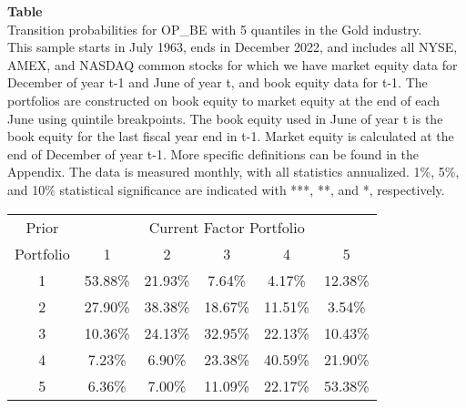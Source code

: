 \begin{table*}[ht!]
\raggedright
{}
\label{tab: transition_probs_OP_BE_Gold_with_5_quantiles}
\textbf{Table \thetable} \\
Transition probabilities for OP_BE with 5 quantiles in the Gold industry. \\
\hspace*{1em}This sample starts in July 1963, ends in December 2022, and includes all NYSE, AMEX, and NASDAQ common stocks for which we have market equity data for December of year t-1 and June of year t, and book equity data for t-1. The portfolios are constructed on book equity to market equity at the end of each June using quintile breakpoints.  The book equity used in June of year t is the book equity for the last fiscal year end in t-1.  Market equity is calculated at the end of December of year t-1.  More specific definitions can be found in the Appendix.  The data is measured monthly, with all statistics annualized.  1\%, 5\%, and 10\% statistical significance are indicated with ***, **, and *, respectively. \\
\vspace{0.5em}
\centering
\begin{adjustbox}{max width=\textwidth}
\begin{tabular}{@{}cccccc@{}}
\toprule
Prior & \multicolumn{5}{c}{Current Factor Portfolio} \\
Portfolio & 1 & 2 & 3 & 4 & 5 \\
\midrule
1 & 53.88\% & 21.93\% & 7.64\% & 4.17\% & 12.38\% \\
2 & 27.90\% & 38.38\% & 18.67\% & 11.51\% & 3.54\% \\
3 & 10.36\% & 24.13\% & 32.95\% & 22.13\% & 10.43\% \\
4 & 7.23\% & 6.90\% & 23.38\% & 40.59\% & 21.90\% \\
5 & 6.36\% & 7.00\% & 11.09\% & 22.17\% & 53.38\% \\
\bottomrule
\end{tabular}
\end{adjustbox}
\end{table*}
